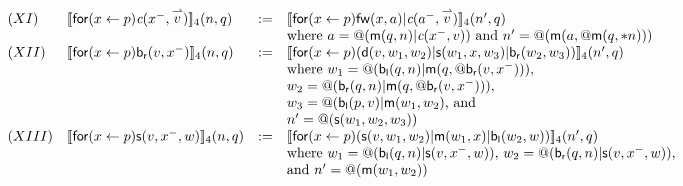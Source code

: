 \documentclass[submission,copyright,creativecommons]{eptcs}
\makeatletter
\newcommand{\ldb}{[\![}
\newcommand{\rdb}{]\!]}
\newcommand{\binpar}[2]{#1 | #2}
\newcommand{\prefix}[3]{\mathsf{for}(#2 \leftarrow #1) #3}
\newcommand{\quotep}[1]{\mathsf{@}#1}
\newcommand{\meaningof}[1]{\ldb #1 \rdb}
\newcommand{\vect}[1]{\stackrel{\rightharpoonup}{#1}}
\theoremstyle{definition}
\theoremstyle{remark}
\theoremstyle{remark}
\makeatother
\begin{document}
\[\begin{array}{llrl}
(XI)&  \meaningof{\prefix{p}{x}{\emph{c}(x^{-},\vect{v})}}_4(n, q) 
    & := & 
    \meaningof{\prefix{p}{x}{\binpar{\mathsf{fw}(x,a)}{\emph{c}(a^{-},\vect{v})}}}_4(n', q)\\
    & & & \mbox{where $a = @(\binpar{\mathsf{m}(q,n)}{\emph{c}(x^{-},v)})$} \mbox{ and $n'= \quotep{(\mathsf{m}(a,\quotep{\mathsf{m}(q,*n)}))}$} \\
(XII)&  \meaningof{\prefix{p}{x}{\mathsf{b}_{\mathsf{r}}(v,x^{-})}}_4(n, q) 
    & := & 
    \meaningof{\prefix{p}{x}{(\binpar{\mathsf{d}(v,w_{1},w_{2})}{\binpar{\mathsf{s}(w_{1},x,w_{3})}{\mathsf{b}_{\mathsf{r}}(w_{2},w_{3})}})}}_{4}(n', q) \\
    & & & \mbox{where $w_{1} = \quotep{(\binpar{\mathsf{b}_{\mathsf{l}}(q,n)}{\mathsf{m}(q,\quotep{\mathsf{b}_{\mathsf{r}}(v,x^{-})})})}$,} \\
    & & & \mbox{$w_{2} = \quotep{(\binpar{\mathsf{b}_{\mathsf{r}}(q,n)}{\mathsf{m}(q,\quotep{\mathsf{b}_{\mathsf{r}}(v,x^{-})})})}$,} \\
    & & & \mbox{$w_{3} = \quotep{(\binpar{\mathsf{b}_{\mathsf{l}}(p,v)}{\mathsf{m}(w_{1},w_{2}})}$, and } \\
    & & & \mbox{$n' = \quotep{(\mathsf{s}(w_{1},w_{2},w_{3}))}$} \\
(XIII)&  \meaningof{\prefix{p}{x}{\mathsf{s}(v,x^{-},w)}}_4(n, q) 
    & := & 
    \meaningof{\prefix{p}{x}{(\binpar{\mathsf{s}(v,w_{1},w_{2})}{\binpar{\mathsf{m}(w_{1},x)}{\mathsf{b}_{\mathsf{l}}(w_{2},w)}})}}_{4}(n', q) \\
    & & & \mbox{where $w_{1} = @(\binpar{\mathsf{b}_{\mathsf{l}}(q,n)}{\mathsf{s}(v,x^{-},w)})$, $w_{2} = @(\binpar{\mathsf{b}_{\mathsf{r}}(q,n)}{\mathsf{s}(v,x^{-},w)})$,} \\
    & & & \mbox{and $n' = \quotep{(\mathsf{m}(w_{1},w_{2}))}$}
\end{array}\]
\end{document}
